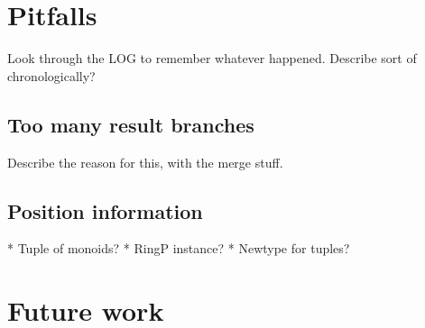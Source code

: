 \documentclass[a4paper,12pt,twosided]{report}
\begin{document}
\section{Pitfalls}
Look through the LOG to remember whatever happened. Describe sort of chronologically?

\subsection{Too many result branches}
Describe the reason for this, with the merge stuff.

\subsection{Position information}
* Tuple of monoids?
* RingP instance?
* Newtype for tuples?

\section{Future work}

%
%




%
%
\end{document}

